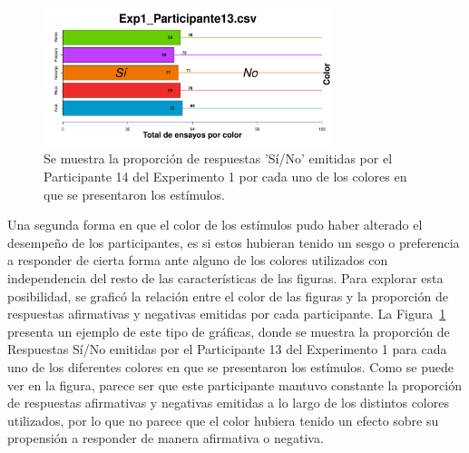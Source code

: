 \begin{itemize}
\begin{figure}[th]
\centering
\includegraphics[width=0.75\textwidth]{Figures/BiasColor_Exp1_P13}
\decoRule
\caption[Explorando datos individuales (ejemplo): Proporción de respuestas 'Sí' y 'No' registradas por cada color de figura]{Se muestra la proporción de respuestas 'Sí/No' emitidas por el Participante 14 del Experimento 1 por cada uno de los colores en que se presentaron los estímulos.}
\label{fig:BiasCol_E1_P13}
\end{figure}
\end{itemize}

Una segunda forma en que el color de los estímulos pudo haber alterado el desempeño de los participantes, es si estos hubieran tenido un sesgo o preferencia a responder de cierta forma ante alguno de los colores utilizados con independencia del resto de las características de las figuras. Para explorar esta posibilidad, se graficó la relación entre el color de las figuras y la proporción de respuestas afirmativas y negativas emitidas por cada participante. La Figura~\ref{fig:BiasCol_E1_P13} presenta un ejemplo de este tipo de gráficas, donde se muestra la proporción de Respuestas Sí/No emitidas por el Participante 13 del Experimento 1 para cada uno de los diferentes colores en que se presentaron los estímulos. Como se puede ver en la figura, parece ser que este participante mantuvo constante la proporción de respuestas afirmativas y negativas emitidas a lo largo de los distintos colores utilizados, por lo que no parece que el color hubiera tenido un efecto sobre su propensión a responder de manera afirmativa o negativa.\\


